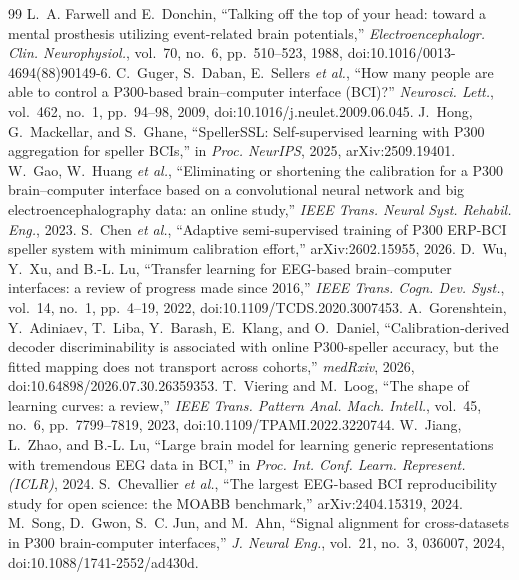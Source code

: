 \documentclass[conference]{IEEEtran}
\begin{document}
\FloatBarrier
\balance
\begin{thebibliography}{99}
 L.~A. Farwell and E.~Donchin, ``Talking off the top of your head: toward a mental prosthesis utilizing event-related brain potentials,'' \emph{Electroencephalogr. Clin. Neurophysiol.}, vol.~70, no.~6, pp.~510--523, 1988, doi:10.1016/0013-4694(88)90149-6.
 C.~Guger, S.~Daban, E.~Sellers \emph{et al.}, ``How many people are able to control a P300-based brain--computer interface (BCI)?'' \emph{Neurosci. Lett.}, vol.~462, no.~1, pp.~94--98, 2009, doi:10.1016/j.neulet.2009.06.045.
 J.~Hong, G.~Mackellar, and S.~Ghane, ``SpellerSSL: Self-supervised learning with P300 aggregation for speller BCIs,'' in \emph{Proc. NeurIPS}, 2025, arXiv:2509.19401.
 W.~Gao, W.~Huang \emph{et al.}, ``Eliminating or shortening the calibration for a P300 brain--computer interface based on a convolutional neural network and big electroencephalography data: an online study,'' \emph{IEEE Trans. Neural Syst. Rehabil. Eng.}, 2023.
 S.~Chen \emph{et al.}, ``Adaptive semi-supervised training of P300 ERP-BCI speller system with minimum calibration effort,'' arXiv:2602.15955, 2026.
 D.~Wu, Y.~Xu, and B.-L. Lu, ``Transfer learning for EEG-based brain--computer interfaces: a review of progress made since 2016,'' \emph{IEEE Trans. Cogn. Dev. Syst.}, vol.~14, no.~1, pp.~4--19, 2022, doi:10.1109/TCDS.2020.3007453.
 A.~Gorenshtein, Y.~Adiniaev, T.~Liba, Y.~Barash, E.~Klang, and O.~Daniel, ``Calibration-derived decoder discriminability is associated with online P300-speller accuracy, but the fitted mapping does not transport across cohorts,'' \emph{medRxiv}, 2026, doi:10.64898/2026.07.30.26359353.
 T.~Viering and M.~Loog, ``The shape of learning curves: a review,'' \emph{IEEE Trans. Pattern Anal. Mach. Intell.}, vol.~45, no.~6, pp.~7799--7819, 2023, doi:10.1109/TPAMI.2022.3220744.
 W.~Jiang, L.~Zhao, and B.-L. Lu, ``Large brain model for learning generic representations with tremendous EEG data in BCI,'' in \emph{Proc. Int. Conf. Learn. Represent. (ICLR)}, 2024.
 S.~Chevallier \emph{et al.}, ``The largest EEG-based BCI reproducibility study for open science: the MOABB benchmark,'' arXiv:2404.15319, 2024.
 M.~Song, D.~Gwon, S.~C. Jun, and M.~Ahn, ``Signal alignment for cross-datasets in P300 brain-computer interfaces,'' \emph{J. Neural Eng.}, vol.~21, no.~3, 036007, 2024, doi:10.1088/1741-2552/ad430d.

\end{thebibliography}
\end{document}

